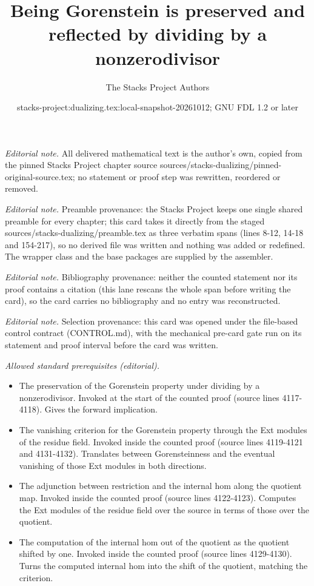\documentclass[10pt,a4paper]{amsart}
\title{Being Gorenstein is preserved and reflected by dividing by a nonzerodivisor}
\author{The Stacks Project Authors}
\date{stacks-project:dualizing.tex:local-snapshot-20261012; GNU FDL 1.2 or later}
\theoremstyle{plain}
\theoremstyle{definition}
\theoremstyle{remark}
\numberwithin{equation}{subsection}
\begin{document}
\maketitle
\noindent\textit{Editorial note.} All delivered mathematical text is the author's own, copied from the pinned Stacks Project chapter source sources/stacks-dualizing/pinned-original-source.tex; no statement or proof step was rewritten, reordered or removed.\par\medskip
\noindent\textit{Editorial note.} Preamble provenance: the Stacks Project keeps one single shared preamble for every chapter; this card takes it directly from the staged sources/stacks-dualizing/preamble.tex as three verbatim spans (lines 8-12, 14-18 and 154-217), so no derived file was written and nothing was added or redefined. The wrapper class and the base packages are supplied by the assembler.\par\medskip
\noindent\textit{Editorial note.} Bibliography provenance: neither the counted statement nor its proof contains a citation (this lane rescans the whole span before writing the card), so the card carries no bibliography and no entry was reconstructed.\par\medskip
\noindent\textit{Editorial note.} Selection provenance: this card was opened under the file-based control contract (CONTROL.md), with the mechanical pre-card gate run on its statement and proof interval before the card was written.\par\medskip
\noindent\textit{Allowed standard prerequisites (editorial).}\begin{itemize}
\item The preservation of the Gorenstein property under dividing by a nonzerodivisor. Invoked at the start of the counted proof (source lines 4117-4118). Gives the forward implication.
\item The vanishing criterion for the Gorenstein property through the Ext modules of the residue field. Invoked inside the counted proof (source lines 4119-4121 and 4131-4132). Translates between Gorensteinness and the eventual vanishing of those Ext modules in both directions.
\item The adjunction between restriction and the internal hom along the quotient map. Invoked inside the counted proof (source lines 4122-4123). Computes the Ext modules of the residue field over the source in terms of those over the quotient.
\item The computation of the internal hom out of the quotient as the quotient shifted by one. Invoked inside the counted proof (source lines 4129-4130). Turns the computed internal hom into the shift of the quotient, matching the criterion.
\end{itemize}\medskip
\end{document}
